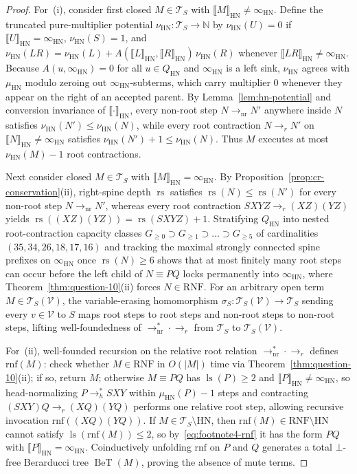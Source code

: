 \documentclass[11pt,reqno]{amsart}
\numberwithin{equation}{section}
\theoremstyle{plain}
\theoremstyle{definition}
\theoremstyle{remark}
\DeclareMathOperator{\ls}{ls}
\DeclareMathOperator{\rs}{rs}
\DeclareMathOperator{\BeT}{BeT}
\newcommand{\TS}{\mathcal{T}_S}
\newcommand{\TSV}{\mathcal{T}_S(\mathcal{V})}
\newcommand{\RNF}{\mathrm{RNF}}
\newcommand{\HN}{\mathrm{HN}}
\newcommand{\sem}[1]{\llbracket #1 \rrbracket}
\begin{document}
\begin{proof}
For~(i), consider first closed $M \in \TS$ with $\sem{M}_{\HN} \neq \infty_{\HN}$. Define the truncated pure-multiplier potential $\nu_{\HN} \colon \TS \to \mathbb{N}$ by $\nu_{\HN}(U) = 0$ if $\sem{U}_{\HN} = \infty_{\HN}$, $\nu_{\HN}(S) = 1$, and $\nu_{\HN}(L R) = \nu_{\HN}(L) + A(\sem{L}_{\HN}, \sem{R}_{\HN})\,\nu_{\HN}(R)$ whenever $\sem{L R}_{\HN} \neq \infty_{\HN}$. Because $A(u, \infty_{\HN}) = 0$ for all $u \in Q_{\HN}$ and $\infty_{\HN}$ is a left sink, $\nu_{\HN}$ agrees with $\mu_{\HN}$ modulo zeroing out $\infty_{\HN}$-subterms, which carry multiplier $0$ whenever they appear on the right of an accepted parent. By Lemma~\ref{lem:hn-potential} and conversion invariance of $\sem{\cdot}_{\HN}$, every non-root step $N \to_{\mathrm{nr}} N'$ anywhere inside $N$ satisfies $\nu_{\HN}(N') \le \nu_{\HN}(N)$, while every root contraction $N \to_r N'$ on $\sem{N}_{\HN} \neq \infty_{\HN}$ satisfies $\nu_{\HN}(N') + 1 \le \nu_{\HN}(N)$. Thus $M$ executes at most $\nu_{\HN}(M) - 1$ root contractions.

Next consider closed $M \in \TS$ with $\sem{M}_{\HN} = \infty_{\HN}$. By Proposition~\ref{prop:cr-conservation}(ii), right-spine depth $\rs$ satisfies $\rs(N) \le \rs(N')$ for every non-root step $N \to_{\mathrm{nr}} N'$, whereas every root contraction $S X Y Z \to_r (X Z)(Y Z)$ yields $\rs((X Z)(Y Z)) = \rs(S X Y Z) + 1$. Stratifying $Q_{\HN}$ into nested root-contraction capacity classes $G_{\ge 0} \supset G_{\ge 1} \supset \dots \supset G_{\ge 5}$ of cardinalities $(35, 34, 26, 18, 17, 16)$ and tracking the maximal strongly connected spine prefixes on $\infty_{\HN}$ once $\rs(N) \ge 6$ shows that at most finitely many root steps can occur before the left child of $N \equiv P Q$ locks permanently into $\infty_{\HN}$, where Theorem~\ref{thm:question-10}(ii) forces $N \in \RNF$. For an arbitrary open term $M \in \TSV$, the variable-erasing homomorphism $\sigma_S \colon \TSV \to \TS$ sending every $v \in \mathcal{V}$ to $S$ maps root steps to root steps and non-root steps to non-root steps, lifting well-foundedness of $\to_{\mathrm{nr}}^* \cdot \to_r$ from $\TS$ to $\TSV$.

For~(ii), well-founded recursion on the relative root relation $\to_{\mathrm{nr}}^* \cdot \to_r$ defines $\mathrm{rnf}(M)$: check whether $M \in \RNF$ in $O(|M|)$ time via Theorem~\ref{thm:question-10}(ii); if so, return $M$; otherwise $M \equiv P Q$ has $\ls(P) \ge 2$ and $\sem{P}_{\HN} \neq \infty_{\HN}$, so head-normalizing $P \to_h^* S X Y$ within $\mu_{\HN}(P) - 1$ steps and contracting $(S X Y) Q \to_r (X Q)(Y Q)$ performs one relative root step, allowing recursive invocation $\mathrm{rnf}((X Q)(Y Q))$. If $M \in \TS \setminus \HN$, then $\mathrm{rnf}(M) \in \RNF \setminus \HN$ cannot satisfy $\ls(\mathrm{rnf}(M)) \le 2$, so by~\eqref{eq:footnote4-rnf} it has the form $P Q$ with $\sem{P}_{\HN} = \infty_{\HN}$. Coinductively unfolding $\mathrm{rnf}$ on $P$ and $Q$ generates a total $\bot$-free Berarducci tree $\BeT(M)$, proving the absence of mute terms.


\end{proof}
\end{document}
